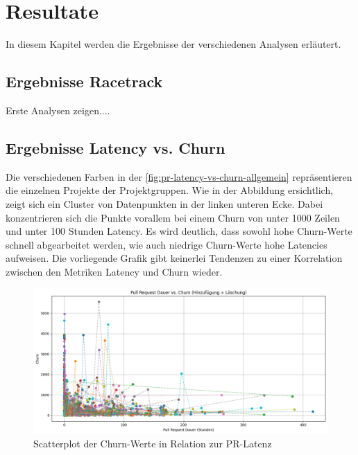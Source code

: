


\chapter{Resultate} %

\label{Chapter4} %

In diesem Kapitel werden die Ergebnisse der verschiedenen Analysen erläutert.
\section{Ergebnisse Racetrack}
Erste Analysen zeigen....
\section{Ergebnisse Latency vs. Churn}
Die verschiedenen Farben in der  \autoref{fig:pr-latency-vs-churn-allgemein}  repräsentieren die einzelnen Projekte der Projektgruppen.
Wie in der Abbildung ersichtlich, zeigt sich ein Cluster von Datenpunkten in der linken unteren Ecke. Dabei konzentrieren sich die Punkte vorallem bei einem Churn von unter 1000 Zeilen und unter 100 Stunden Latency. Es wird deutlich, dass sowohl hohe Churn-Werte schnell abgearbeitet werden, wie auch niedrige Churn-Werte hohe Latencies aufweisen. Die vorliegende Grafik gibt keinerlei Tendenzen zu einer Korrelation zwischen den Metriken Latency und Churn wieder.
\begin{figure}[th]
    \centering
    \includegraphics[width=\textwidth]{pr-latency-vs-churn-allgemein.png}
    \caption{Scatterplot der Churn-Werte in Relation zur PR-Latenz}
    \label{fig:pr-latency-vs-churn-allgemein}
\end{figure}

